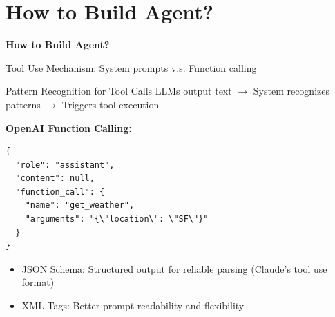 \documentclass[aspectratio=169]{beamer}
\begin{document}
\section{How to Build Agent?}

\begin{frame}
	\begin{center}
		\Large
		\textbf{How to Build Agent?}

	\end{center}
\end{frame}

\begin{frame}[fragile]{Tool Use Mechanism: System prompts v.s. Function calling}
	\begin{block}{Pattern Recognition for Tool Calls}
		LLMs output text $\rightarrow$ System recognizes patterns $\rightarrow$ Triggers tool execution
	\end{block}

		\textbf{OpenAI Function Calling:}
\begin{lstlisting}
{
  "role": "assistant",
  "content": null,
  "function_call": {
    "name": "get_weather",
    "arguments": "{\"location\": \"SF\"}"
  }
}
\end{lstlisting}
	
	\vspace{0.3cm}
	\begin{itemize}
		\item {\color{highlight}JSON Schema}: Structured output for reliable parsing (Claude's tool use format)
		\item {\color{highlight}XML Tags}: Better prompt readability and flexibility
	\end{itemize}
\end{frame}
\end{document}
